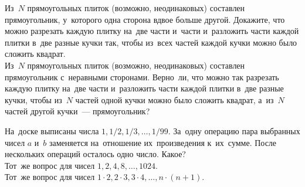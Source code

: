 \begin{problems}

\item
\subproblem
Из~$N$ прямоугольных плиток (возможно, неодинаковых) составлен прямоугольник,
у~которого одна сторона вдвое больше другой.
Докажите, что можно разрезать каждую плитку на~две части и~части и~разложить
части каждой плитки в~две разные кучки так, чтобы из~всех частей каждой кучки
можно было сложить квадрат.
\\
\subproblem
Из~$N$ прямоугольных плиток (возможно, неодинаковых) составлен прямоугольник
с~неравными сторонами.
Верно~ли, что можно так разрезать каждую плитку на~две части и~разложить части
каждой плитки в~две разные кучки, чтобы из~$N$ частей одной кучки можно было
сложить квадрат, а~из~$N$ частей другой кучки~--- прямоугольник?

\item
\subproblem
На~доске выписаны числа $1, 1/2, 1/3, \ldots, 1/99$.
За~одну операцию пара выбранных чисел $a$ и~$b$ заменяется на~отношение
их~произведения к~их~сумме.
После нескольких операций осталось одно число.
Какое?
\\
\subproblem
Тот~же вопрос для чисел $1, 2, 4, 8, \ldots, 1024$.
\\
\subproblem
Тот~же вопрос для чисел
$1 \cdot 2, 2 \cdot 3, 3 \cdot 4, \ldots, n \cdot (n + 1)$.

\end{problems}

